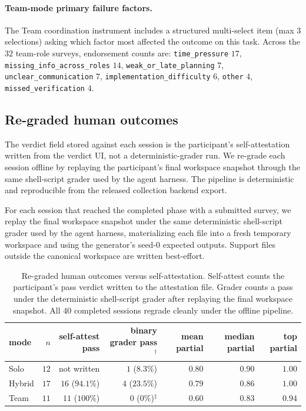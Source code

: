 \documentclass{article}
\begin{document}
\paragraph{Team-mode primary failure factors.} The Team coordination instrument includes a structured multi-select item (max $3$ selections) asking which factor most affected the outcome on this task. Across the $32$ team-role surveys, endorsement counts are: \texttt{time\_pressure} $17$, \texttt{missing\_info\_across\_roles} $14$, \texttt{weak\_or\_late\_planning} $7$, \texttt{unclear\_communication} $7$, \texttt{implementation\_difficulty} $6$, \texttt{other} $4$, \texttt{missed\_verification} $4$.

\subsection{Re-graded human outcomes}
\label{app:human-regrade}

The verdict field stored against each session is the participant's self-attestation written from the verdict UI, not a deterministic-grader run. We re-grade each session offline by replaying the participant's final workspace snapshot through the same shell-script grader used by the agent harness. The pipeline is deterministic and reproducible from the released collection backend export.

For each session that reached the completed phase with a submitted survey, we replay the final workspace snapshot under the same deterministic shell-script grader used by the agent harness, materializing each file into a fresh temporary workspace and using the generator's seed-0 expected outputs. Support files outside the canonical workspace are written best-effort.

\begin{table}[h]                             
\centering                                   
\small                                       
\caption{Re-graded human outcomes versus self-attestation. Self-attest counts the participant's pass verdict written to the attestation file. Grader counts a pass under the deterministic shell-script grader after replaying the final workspace snapshot. All 40 completed sessions regrade cleanly under the offline pipeline.}                         
  \label{tab:human-regrade}               
  \begin{tabular}{lrrrrrr}                    \toprule                                    mode & $n$ & self-attest pass & binary grader pass$^{\dagger}$ & mean partial & median partial & top partial \\   
  \midrule                                    Solo   & $12$ & not written      & $1$ ($8.3\%$)  & $0.80$ & $0.90$ & $1.00$ \\    Hybrid & $17$ & $16$ ($94.1\%$)  & $4$ ($23.5\%$) & $0.79$ & $0.86$ & $1.00$ \\    Team   & $11$ & $11$ ($100\%$)   & $0$ ($0\%$)$^{\ddagger}$ & $0.60$ & $0.83$ & $0.94$ \\                                   \bottomrule                                \end{tabular}
\end{table}  
 
\end{document}
